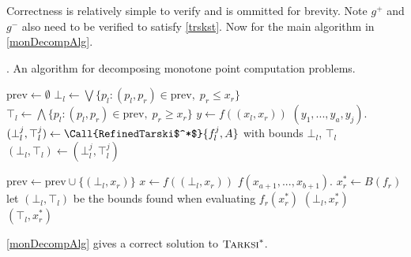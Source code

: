 Correctness is relatively simple to verify and is ommitted for brevity. Note
$g^+$ and $g^-$ also need to be verified to satisfy \cref{trskst}.
Now for the main algorithm in \cref{monDecompAlg}.
\begin{algorithm}[h]
  \caption{\citep{chenLi}. An algorithm for decomposing monotone point computation problems.} \label{monDecompAlg}
  \begin{algorithmic}[1]
    \State $\mathrm{prev} \gets \emptyset$
      \State $\bot_l \gets \bigvee\{p_l : (p_l, p_r) \in \mathrm{prev}, \; p_r \leq x_r \}$
      \State $\top_l \gets \bigwedge\{p_l : (p_l, p_r) \in \mathrm{prev}, \; p_r \geq x_r \}$
        \State $y \gets f((x_l, x_r))$
        \State \Return $(y_1, ..., y_a, y_j)$.
      \EndProcedure
      \State $(\bot_l^j, \top_l^j) \gets \Call{RefinedTarski$^*$}{f_l^j, A}$ with bounds $\bot_l$, $\top_l$
      \State $(\bot_l, \top_l) \gets (\bot_l^j, \top_l^j)$
      \EndFor

      \State $\mathrm{prev} \gets \mathrm{prev} \cup \{(\bot_l, x_r)\}$
      \State $x \gets f((\bot_l, x_r))$
      \State \Return $f(x_{a + 1}, ..., x_{b + 1})$.
    \EndProcedure
    \State $x_r^* \gets B(f_r)$
    \State let $(\bot_l, \top_l)$ be the bounds found when evaluating $f_r(x_r^*)$
     \Return $(\bot_l, x_r^*)$ \algorithmicelse\ \Return $(\top_l, x_r^*)$ \EndIf
  \EndProcedure
  \end{algorithmic}
\end{algorithm}
\begin{lemma}
  \cref{monDecompAlg} gives a correct solution to $\textsc{Tarksi}^*$.
\end{lemma}
